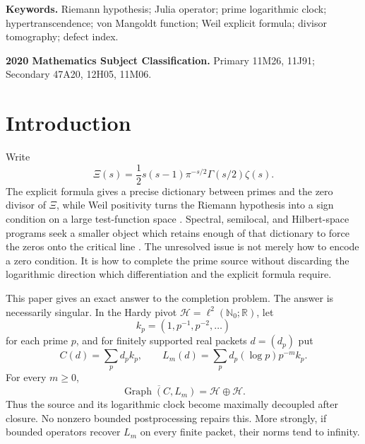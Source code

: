 \documentclass[11pt]{article}
\theoremstyle{definition}
\theoremstyle{remark}
\newcommand{\R}{\mathbb R}
\newcommand{\N}{\mathbb N}
\newcommand{\cH}{\mathcal H}
\newcommand{\Graph}{\operatorname{Graph}}
\begin{document}
\medskip
\noindent\textbf{Keywords.}
Riemann hypothesis; Julia operator; prime logarithmic clock; hypertranscendence;
von Mangoldt function; Weil explicit formula; divisor tomography; defect index.

\medskip
\noindent\textbf{2020 Mathematics Subject Classification.}
Primary 11M26, 11J91; Secondary 47A20, 12H05, 11M06.

\section{Introduction}\label{sec:intro}

Write
\[
 \Xi(s)=\frac12s(s-1)\pi^{-s/2}\Gamma(s/2)\zeta(s).
\]
The explicit formula gives a precise dictionary between primes and the zero divisor of
\(\Xi\), while Weil positivity turns the Riemann hypothesis into a sign condition on a large
test-function space \cite{Weil1952,Guinand1949,Barner1981,Bombieri2000,Bombieri2003}.  Spectral,
semilocal, and Hilbert-space programs seek a smaller object which retains enough of that
dictionary to force the zeros onto the critical line
\cite{Connes1999,ConnesConsani2021,ConnesConsani2023,CCM2025,Suzuki2025,Suzuki2026}.
The unresolved issue is not merely how to encode a zero condition.  It is how to complete the
prime source without discarding the logarithmic direction which differentiation and the
explicit formula require.

This paper gives an exact answer to the completion problem.  The answer is necessarily singular.
In the Hardy pivot \(\cH=\ell^2(\N_0;\R)\), let
\[
 k_p=(1,p^{-1},p^{-2},\ldots)
\]
for each prime \(p\), and for finitely supported real packets \(d=(d_p)\) put
\[
 C(d)=\sum_p d_pk_p,\qquad
 L_m(d)=\sum_p d_p(\log p)p^{-m}k_p.                 \tag{1.1}
\]
For every \(m\ge0\),
\[
 \overline{\Graph(C,L_m)}=\cH\oplus\cH.              \tag{1.2}
\]
Thus the source and its logarithmic clock become maximally decoupled after closure.  No
nonzero bounded postprocessing repairs this.  More strongly, if bounded operators recover
\(L_m\) on every finite packet, their norms tend to infinity.
\end{document}
